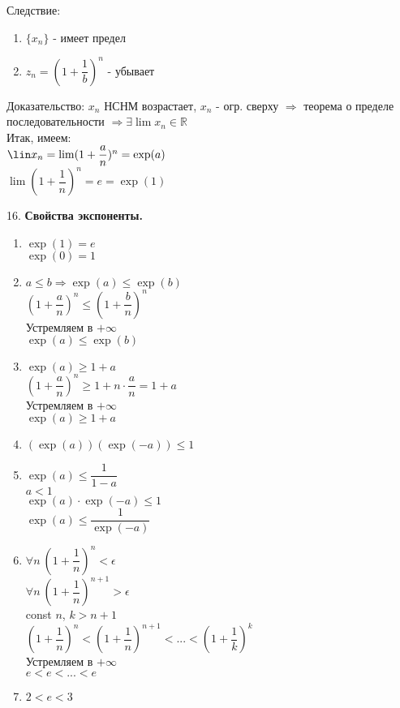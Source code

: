 \documentclass[12pt]{article}
\begin{document}
Следствие:
\begin{enumerate}
    \item $\{x_n\}$ - имеет предел
    \item $z_n = (1 + \dfrac{1}{b})^n$ - убывает
\end{enumerate}
Доказательство: $x_n$ НСНМ возрастает, $x_n$ - огр. сверху $\Rightarrow$ теорема о пределе последовательности $\Rightarrow \exists \lim x_n \in \mathbb{R}$\\

Итак, имеем:\\
$\lin x_n = \lim(1 + \dfrac{a}{n})^n = \exp(a)$\\
$\lim(1 + \dfrac{1}{n})^n = e = \exp(1)$

16. \textbf{Свойства экспоненты.}\\
\begin{enumerate}
    \item $\exp(1) = e$\\
    $\exp(0) = 1$
    \item $a \le b \Rightarrow \exp(a) \le \exp(b)$\\
    $(1 + \dfrac{a}{n})^n \le (1 + \dfrac{b}{n})^n$\\
    Устремляем в $+\infty$\\
    $\exp(a) \le \exp(b)$
    \item $\exp(a) \ge 1 + a$\\
    $(1 + \dfrac{a}{n})^n \ge 1 + n \cdot \dfrac{a}{n} = 1 + a$\\
    Устремляем в $+\infty$\\
    $\exp(a) \ge 1 + a$
    \item $(\exp(a))(\exp(-a)) \le 1$
    \item $\exp(a) \le \dfrac{1}{1 - a}$\\
    $a < 1$\\
    $\exp(a) \cdot \exp(-a) \le 1$\\
    $\exp(a) \le \dfrac{1}{\exp(-a)}$
    \item $\forall n\ (1 + \dfrac{1}{n})^n < \epsilon$\\
    $\forall n\ (1 + \dfrac{1}{n})^{n+1} > \epsilon$\\
    const $n$, $k > n + 1$\\
    $(1 + \dfrac{1}{n})^n < (1 + \dfrac{1}{n})^{n+1} < ... < (1 + \dfrac{1}{k})^k$\\
    Устремляем в $+\infty$\\
    $e < e < ... < e$
    \item $2 < e < 3$
\end{enumerate}
\end{document}
